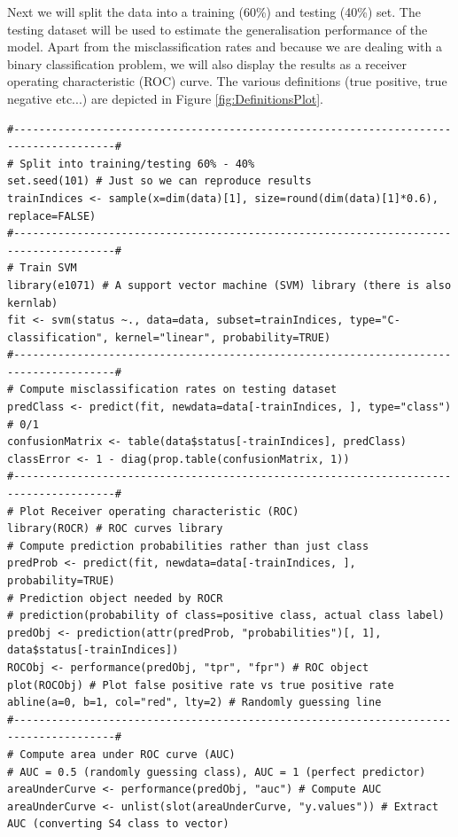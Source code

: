 \documentclass[a4paper,11pt]{article}
\begin{document}
Next we will split the data into a training (60\%) and testing (40\%) set. The testing dataset will
be used to estimate the generalisation performance of the model. Apart from the misclassification
rates and because we are dealing with a binary classification problem, we will also display the results 
as a receiver operating characteristic (ROC) curve. The various definitions (true positive, true negative etc...)
are depicted in Figure \ref{fig:DefinitionsPlot}.
\clearpage
\begin{lstlisting}[style=RCode]
#--------------------------------------------------------------------------------------#
# Split into training/testing 60% - 40%
set.seed(101) # Just so we can reproduce results
trainIndices <- sample(x=dim(data)[1], size=round(dim(data)[1]*0.6), replace=FALSE)
#--------------------------------------------------------------------------------------#
# Train SVM
library(e1071) # A support vector machine (SVM) library (there is also kernlab)
fit <- svm(status ~., data=data, subset=trainIndices, type="C-classification", kernel="linear", probability=TRUE)
#--------------------------------------------------------------------------------------#
# Compute misclassification rates on testing dataset
predClass <- predict(fit, newdata=data[-trainIndices, ], type="class") # 0/1
confusionMatrix <- table(data$status[-trainIndices], predClass)
classError <- 1 - diag(prop.table(confusionMatrix, 1))
#--------------------------------------------------------------------------------------#
# Plot Receiver operating characteristic (ROC)
library(ROCR) # ROC curves library
# Compute prediction probabilities rather than just class
predProb <- predict(fit, newdata=data[-trainIndices, ], probability=TRUE)
# Prediction object needed by ROCR
# prediction(probability of class=positive class, actual class label)
predObj <- prediction(attr(predProb, "probabilities")[, 1], data$status[-trainIndices]) 
ROCObj <- performance(predObj, "tpr", "fpr") # ROC object
plot(ROCObj) # Plot false positive rate vs true positive rate
abline(a=0, b=1, col="red", lty=2) # Randomly guessing line
#--------------------------------------------------------------------------------------#
# Compute area under ROC curve (AUC)
# AUC = 0.5 (randomly guessing class), AUC = 1 (perfect predictor)
areaUnderCurve <- performance(predObj, "auc") # Compute AUC
areaUnderCurve <- unlist(slot(areaUnderCurve, "y.values")) # Extract AUC (converting S4 class to vector)
\end{lstlisting}
\end{document}
